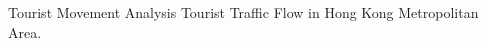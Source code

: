 \documentclass[
 size=14pt,
 paper=smartboard,  %
 mode=present, 		%
 display=slides, 	%
 style=tuliplab,  	%
 pauseslide,
 fleqn,leqno]{powerdot}
\begin{document}
\begin{slide}[toc=,bm=]{Tourist Movement Analysis}
Tourist Traffic Flow in Hong Kong Metropolitan Area.

\begin{figure}[htbp]
\end{figure}
\end{slide}
\end{document}
